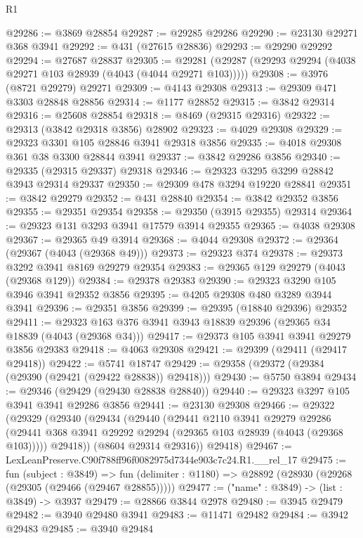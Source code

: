 \begin{lexlean}{R1}
\begin{coremodule}
@29286 := @3869 @28854
@29287 := @29285 @29286
@29290 := @23130 @29271 @368 @3941
@29292 := @431 (@27615 @28836)
@29293 := @29290 @29292
@29294 := @27687 @28837
@29305 := @29281 (@29287 (@29293 @29294 (@4038 @29271 @103 @28939 (@4043 (@4044 @29271 @103)))))
@29308 := @3976 (@8721 @29279) @29271
@29309 := @4143 @29308
@29313 := @29309 @471 @3303 @28848 @28856
@29314 := @1177 @28852
@29315 := @3842 @29314
@29316 := @25608 @28854
@29318 := @8469 (@29315 @29316)
@29322 := @29313 (@3842 @29318 @3856) @28902
@29323 := @4029 @29308
@29329 := @29323 @3301 @105 @28846 @3941 @29318 @3856
@29335 := @4018 @29308 @361 @38 @3300 @28844 @3941
@29337 := @3842 @29286 @3856
@29340 := @29335 (@29315 @29337) @29318
@29346 := @29323 @3295 @3299 @28842 @3943 @29314 @29337
@29350 := @29309 @478 @3294 @19220 @28841
@29351 := @3842 @29279
@29352 := @431 @28840
@29354 := @3842 @29352 @3856
@29355 := @29351 @29354
@29358 := @29350 (@3915 @29355) @29314
@29364 := @29323 @131 @3293 @3941 @17579 @3914 @29355
@29365 := @4038 @29308
@29367 := @29365 @49 @3914
@29368 := @4044 @29308
@29372 := @29364 (@29367 (@4043 (@29368 @49)))
@29373 := @29323 @374
@29378 := @29373 @3292 @3941 @8169 @29279 @29354
@29383 := @29365 @129 @29279 (@4043 (@29368 @129))
@29384 := @29378 @29383
@29390 := @29323 @3290 @105 @3946 @3941 @29352 @3856
@29395 := @4205 @29308 @480 @3289 @3944 @3941
@29396 := @29351 @3856
@29399 := @29395 (@18840 @29396) @29352
@29411 := @29323 @163 @376 @3941 @3943 @18839 @29396 (@29365 @34 @18839 (@4043 (@29368 @34)))
@29417 := @29373 @105 @3941 @3941 @29279 @3856 @29383
@29418 := @4063 @29308
@29421 := @29399 (@29411 (@29417 @29418))
@29422 := @5741 @18747
@29429 := @29358 (@29372 (@29384 (@29390 (@29421 (@29422 @28838)) @29418)))
@29430 := @5750 @3894
@29434 := @29346 (@29429 (@29430 @28838 @28840))
@29440 := @29323 @3297 @105 @3941 @3941 @29286 @3856
@29441 := @23130 @29308
@29466 := @29322
    (@29329
      (@29340
        (@29434
          (@29440
            (@29441
              @2110
              @3941
              @29279
              @29286
              (@29441 @368 @3941 @29292 @29294 (@29365 @103 @28939 (@4043 (@29368 @103)))))
            @29418))
        (@8604 @29314 @29316))
      @29418)
@29467 := LexLeanPreserve.C90f788ff96f0082975d7344e903c7c24.R1.__rel_17
@29475 := fun (subject : @3849) =>
  fun (delimiter : @1180) => @28892 (@28930 (@29268 (@29305 (@29466 (@29467 @28855)))))
@29477 := ("name" : @3849) -> (list : @3849) -> @3937
@29479 := @28866 @3844 @2978
@29480 := @3945 @29479
@29482 := @3940 @29480 @3941
@29483 := @11471 @29482
@29484 := @3942 @29483
@29485 := @3940 @29484

\end{coremodule}
\end{lexlean}
